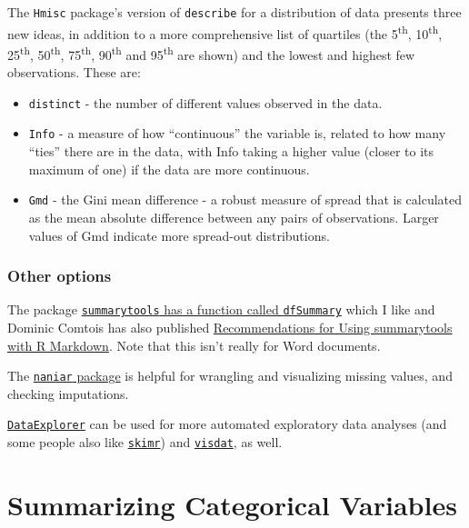 \documentclass[
]{book}
\providecommand{\tightlist}{%
  \setlength{\itemsep}{0pt}\setlength{\parskip}{0pt}}
\begin{document}
The \texttt{Hmisc} package's version of \texttt{describe} for a distribution of data presents three new ideas, in addition to a more comprehensive list of quartiles (the 5\textsuperscript{th}, 10\textsuperscript{th}, 25\textsuperscript{th}, 50\textsuperscript{th}, 75\textsuperscript{th}, 90\textsuperscript{th} and 95\textsuperscript{th} are shown) and the lowest and highest few observations. These are:

\begin{itemize}
\tightlist
\item
  \texttt{distinct} - the number of different values observed in the data.
\item
  \texttt{Info} - a measure of how ``continuous'' the variable is, related to how many ``ties'' there are in the data, with Info taking a higher value (closer to its maximum of one) if the data are more continuous.
\item
  \texttt{Gmd} - the Gini mean difference - a robust measure of spread that is calculated as the mean absolute difference between any pairs of observations. Larger values of Gmd indicate more spread-out distributions.
\end{itemize}

\hypertarget{other-options}{%
\subsection{Other options}\label{other-options}}

The package \href{https://cran.r-project.org/web/packages/summarytools/vignettes/Introduction.html}{\texttt{summarytools} has a function called \texttt{dfSummary}} which I like and Dominic Comtois has also published \href{https://cran.r-project.org/web/packages/summarytools/vignettes/Recommendations-rmarkdown.html}{Recommendations for Using summarytools with R Markdown}. Note that this isn't really for Word documents.

The \href{http://naniar.njtierney.com/}{\texttt{naniar} package} is helpful for wrangling and visualizing missing values, and checking imputations.

\href{https://boxuancui.github.io/DataExplorer/}{\texttt{DataExplorer}} can be used for more automated exploratory data analyses (and some people also like \href{https://github.com/ropensci/skimr}{\texttt{skimr}}) and \href{http://visdat.njtierney.com/}{\texttt{visdat}}, as well.

\hypertarget{summarizing-categorical-variables}{%
\chapter{Summarizing Categorical Variables}\label{summarizing-categorical-variables}}
\end{document}
